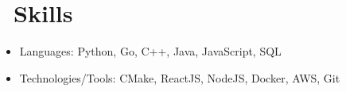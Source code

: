 \documentclass{resume}
\begin{document}

\section{\faCogs\ Skills}
\begin{itemize}[parsep=0.5ex]
  \item Languages: Python, Go, C++, Java, JavaScript, SQL
  \item Technologies/Tools: CMake, ReactJS, NodeJS, Docker, AWS, Git
\end{itemize}

%
%
\end{document}
